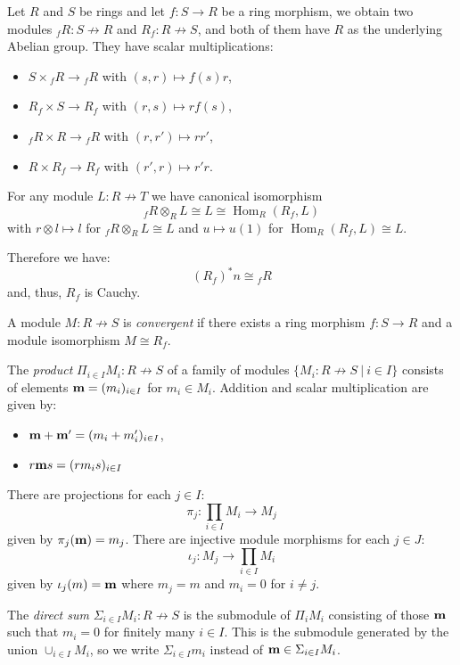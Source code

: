 \documentclass[8pt]{article}
\theoremstyle{definition}
\theoremstyle{definition}
\theoremstyle{definition}
\theoremstyle{definition}
\theoremstyle{definition}
\theoremstyle{definition}
\theoremstyle{definition}
\theoremstyle{definition}
\theoremstyle{definition}
\theoremstyle{definition}
\theoremstyle{definition}
\theoremstyle{definition}
\theoremstyle{definition}
\theoremstyle{definition}
\theoremstyle{question}
\begin{document}
Let $R$ and $S$ be rings and let $f : S \to R$ be a ring morphism, we obtain two modules
${}_f R : S \not\to R$ and $R_f : R \not\to S$, and both of them have $R$ as the underlying
Abelian group. They have scalar multiplications:
\begin{itemize}
  \item $S \times {}_f R \to {}_f R$ with $(s, r) \mapsto f(s) r$,
  \item $R_f \times S \to R_f$ with $(r, s) \mapsto r f(s)$,
  \item ${}_f R \times R \to {}_f R$ with $(r, r') \mapsto r r'$,
  \item $R \times R_f \to R_f$ with $(r', r) \mapsto r' r$.
\end{itemize}

For any module $L : R \not\to T$ we have canonical isomorphism
\[
{}_f R \otimes_R L \cong L \cong \operatorname{Hom}_R(R_f, L)
\]
with $r \otimes l \mapsto l$ for ${}_f R \otimes_R L \cong L$
and $u \mapsto u(1)$ for $\operatorname{Hom}_R(R_f, L) \cong L$.

Therefore we have:
\[
(R_f)^* n \cong {}_f R
\]
and, thus, $R_f$ is Cauchy.

A module $M : R \not\to S$ is \emph{convergent} if there exists a ring morphism $f : S \to R$
and a module isomorphism $M \cong R_f$.

The \emph{product} $\Pi_{i \in I} M_i : R \not\to S$ of a family of modules $\{ M_i : R \not\to S \: | \: i \in I \}$
consists of elements ${\bf m} = (m_i)_{i \in I}$ for $m_i \in M_i$. Addition and scalar multiplication
are given by:
\begin{itemize}
  \item ${\bf m} + {\bf m}' = (m_i + m'_i)_{i \in I}$,
  \item $r {\bf m} s = (r m_i s)_{i \in I}$
\end{itemize}
There are projections for each $j \in I$:
\[
\pi_j : \prod \limits_{i \in I} M_i \to M_j
\]
given by $\pi_j({\bf m}) = m_j$. There are injective module morphisms for each $j \in J$:
\[
\iota_j : M_j \to \prod \limits_{i \in I} M_i
\]
given by $\iota_j(m) = {\bf m}$ where $m_j = m$ and $m_i = 0$ for $i \neq j$.

The \emph{direct sum} $\Sigma_{i \in I} M_i : R \not\to S$ is the submodule of $\Pi_i M_i$ 
consisting of those ${\bf m}$ such that $m_i = 0$ for finitely many $i \in I$. This is the submodule
generated by the union $\cup_{i \in I} M_i$, so we write $\Sigma_{i \in I} m_i$ 
instead of ${\bf m} \in \Sigma_{i \in I} M_i$.
\end{document}
